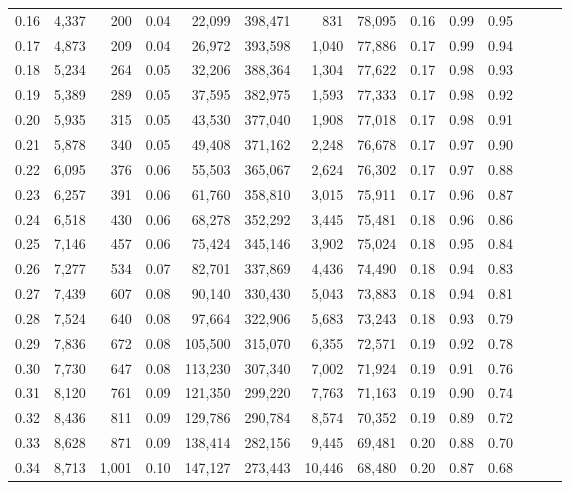 \begin{tabular}{rrrrrrrrrrrrrr}
0.16 &  4,337 &    200 &  0.04 &   22,099 &  398,471 &     831 &  78,095 &  0.16 &  0.99 &      0.95 \\
0.17 &  4,873 &    209 &  0.04 &   26,972 &  393,598 &   1,040 &  77,886 &  0.17 &  0.99 &      0.94 \\
0.18 &  5,234 &    264 &  0.05 &   32,206 &  388,364 &   1,304 &  77,622 &  0.17 &  0.98 &      0.93 \\
0.19 &  5,389 &    289 &  0.05 &   37,595 &  382,975 &   1,593 &  77,333 &  0.17 &  0.98 &      0.92 \\
0.20 &  5,935 &    315 &  0.05 &   43,530 &  377,040 &   1,908 &  77,018 &  0.17 &  0.98 &      0.91 \\
0.21 &  5,878 &    340 &  0.05 &   49,408 &  371,162 &   2,248 &  76,678 &  0.17 &  0.97 &      0.90 \\
0.22 &  6,095 &    376 &  0.06 &   55,503 &  365,067 &   2,624 &  76,302 &  0.17 &  0.97 &      0.88 \\
0.23 &  6,257 &    391 &  0.06 &   61,760 &  358,810 &   3,015 &  75,911 &  0.17 &  0.96 &      0.87 \\
0.24 &  6,518 &    430 &  0.06 &   68,278 &  352,292 &   3,445 &  75,481 &  0.18 &  0.96 &      0.86 \\
0.25 &  7,146 &    457 &  0.06 &   75,424 &  345,146 &   3,902 &  75,024 &  0.18 &  0.95 &      0.84 \\
0.26 &  7,277 &    534 &  0.07 &   82,701 &  337,869 &   4,436 &  74,490 &  0.18 &  0.94 &      0.83 \\
0.27 &  7,439 &    607 &  0.08 &   90,140 &  330,430 &   5,043 &  73,883 &  0.18 &  0.94 &      0.81 \\
0.28 &  7,524 &    640 &  0.08 &   97,664 &  322,906 &   5,683 &  73,243 &  0.18 &  0.93 &      0.79 \\
0.29 &  7,836 &    672 &  0.08 &  105,500 &  315,070 &   6,355 &  72,571 &  0.19 &  0.92 &      0.78 \\
0.30 &  7,730 &    647 &  0.08 &  113,230 &  307,340 &   7,002 &  71,924 &  0.19 &  0.91 &      0.76 \\
0.31 &  8,120 &    761 &  0.09 &  121,350 &  299,220 &   7,763 &  71,163 &  0.19 &  0.90 &      0.74 \\
0.32 &  8,436 &    811 &  0.09 &  129,786 &  290,784 &   8,574 &  70,352 &  0.19 &  0.89 &      0.72 \\
0.33 &  8,628 &    871 &  0.09 &  138,414 &  282,156 &   9,445 &  69,481 &  0.20 &  0.88 &      0.70 \\
0.34 &  8,713 &  1,001 &  0.10 &  147,127 &  273,443 &  10,446 &  68,480 &  0.20 &  0.87 &      0.68 \\

\end{tabular}
